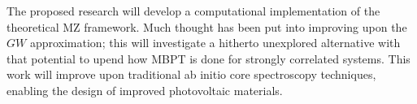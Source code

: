 The proposed research will develop a computational implementation of the theoretical MZ framework. Much thought has been put into improving upon the $GW$ approximation; this will investigate a hitherto unexplored alternative with that potential to upend how MBPT is done for strongly correlated systems. This work will improve upon traditional ab initio core spectroscopy techniques, enabling the design of improved photovoltaic materials.